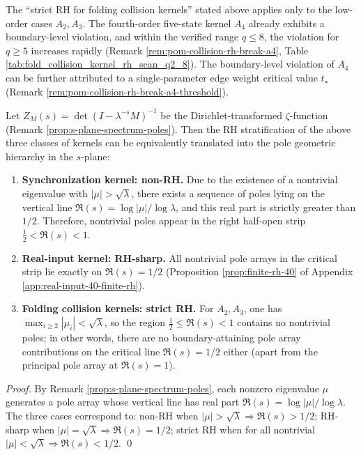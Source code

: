 \begin{remark}[Near-RH violation by higher-order folding collision kernels: starting from \texorpdfstring{$q=4$}{q=4}]\label{rem:collision-kernel-rh-break-q4}
The ``strict RH for folding collision kernels'' stated above applies only to the low-order cases \(A_2,A_3\).
The fourth-order five-state kernel \(A_4\) already exhibits a boundary-level violation, and within the verified range \(q\le 8\), the violation for \(q\ge 5\) increases rapidly (Remark \ref{rem:pom-collision-rh-break-a4}, Table \ref{tab:fold_collision_kernel_rh_scan_q2_8}). The boundary-level violation of \(A_4\) can be further attributed to a single-parameter edge weight critical value \(t_\star\) (Remark \ref{rem:pom-collision-rh-break-a4-threshold}).
\end{remark}

\begin{corollary}\label{cor:rh-stratification-splane}
Let \(Z_M(s)=\det(I-\lambda^{-s}M)^{-1}\) be the Dirichlet-transformed \(\zeta\)-function (Remark \ref{prop:s-plane-spectrum-poles}). Then the RH stratification of the above three classes of kernels can be equivalently translated into the pole geometric hierarchy in the \(s\)-plane:
\begin{enumerate}
  \item \textbf{Synchronization kernel: non-RH.} Due to the existence of a nontrivial eigenvalue with \(|\mu|>\sqrt{\lambda}\), there exists a sequence of poles lying on the vertical line
  \(
  \Re(s)=\log|\mu|/\log\lambda
  \),
  and this real part is strictly greater than \(1/2\). Therefore, nontrivial poles appear in the right half-open strip \(\tfrac12<\Re(s)<1\).
  \item \textbf{Real-input kernel: RH-sharp.} All nontrivial pole arrays in the critical strip lie exactly on \(\Re(s)=1/2\) (Proposition \ref{prop:finite-rh-40} of Appendix \ref{app:real-input-40-finite-rh}).
  \item \textbf{Folding collision kernels: strict RH.} For \(A_2,A_3\), one has \(\max_{i\ge 2}|\mu_i|<\sqrt{\lambda}\), so the region \(\tfrac12\le \Re(s)<1\) contains no nontrivial poles; in other words, there are no boundary-attaining pole array contributions on the critical line \(\Re(s)=1/2\) either (apart from the principal pole array at \(\Re(s)=1\)).
\end{enumerate}
\end{corollary}
\begin{proof}
By Remark \ref{prop:s-plane-spectrum-poles}, each nonzero eigenvalue \(\mu\) generates a pole array whose vertical line has real part \(\Re(s)=\log|\mu|/\log\lambda\). The three cases correspond to:
non-RH when \(|\mu|>\sqrt{\lambda}\Rightarrow \Re(s)>1/2\);
RH-sharp when \(|\mu|=\sqrt{\lambda}\Rightarrow \Re(s)=1/2\);
strict RH when for all nontrivial \(|\mu|<\sqrt{\lambda}\Rightarrow \Re(s)<1/2\).
\qed
\end{proof}


